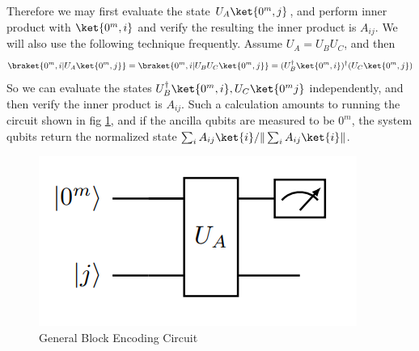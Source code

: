 \documentclass[12pt, oneside]{book}
\theoremstyle{definition}
\theoremstyle{definition}
\theoremstyle{remark}
\begin{document}
Therefore we may first evaluate the state $U_A\ket{0^m,j}$, and perform inner product with $\ket{0^m,i}$ and verify the resulting the inner product is $A_{ij}$. We will also use the following technique frequently. Assume $U_A=U_BU_C$, and then
\[
\braket{0^m,i|U_A\ket{0^m,j}}=\braket{0^m,i|U_BU_C\ket{0^m,j}}=(U^{\dagger}_B\ket{0^m,i})^{\dagger}(U_C\ket{0^m,j})
\]
So we can evaluate the states $U^{\dagger}_B\ket{0^m,i},U_C\ket{0^mj}$ independently, and then verify the inner product is $A_{ij}$. Such a calculation amounts to running the circuit shown in fig \ref{fig:generalblockencoding}, and if the ancilla qubits are measured to be $0^m$, the system qubits return the normalized state $\sum_iA_{ij}\ket{i}/\|\sum_iA_{ij}\ket{i}\|$.
\begin{figure}
    \centering
    \includegraphics[width=1\linewidth]{../images/generalblockencoding.png}
    \caption{General Block Encoding Circuit}
    \label{fig:generalblockencoding}
\end{figure}
\end{document}
